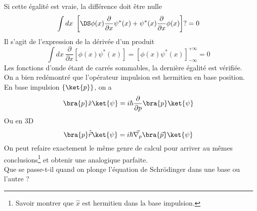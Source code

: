 Si cette égalité est vraie, la différence doit être nulle
\begin{equation}
\int dx\ \left[\DS \phi(x)\frac{\partial}{\partial x}\psi^*(x) + \psi^*(x)\frac{\partial}{\partial x}\phi(x)
\right]?=0
\end{equation}
Il s'agit de l'expression de la dérivée d'un produit
\begin{equation}
\int dx\ \dfrac{\partial}{\partial x}\left[\phi(x)\psi^*(x)\right] = \left[\phi(x)\psi^*(x)\right]_{-\infty}^{
+\infty} = 0
\end{equation}
Les fonctions d'onde étant de carrés sommables, la dernière égalité est vérifiée.
On a bien redémontré que l'opérateur impulsion est hermitien en base position. \\

En base impulsion $\left\{\ket{p}\right\}$, on a 
\begin{equation}
\bra{p}\hat{x}\ket{\psi} = i\hbar \frac{\partial}{\partial p}\bra{p}\ket{\psi}
\end{equation}
Ou en 3D
\begin{equation}
\bra{p}\hat{\vec{r}}\ket{\psi} = i\hbar\vec{\nabla_p}\bra{\vec{p}}\ket{\psi}
\end{equation}
On peut refaire exactement le même genre de calcul pour arriver au mêmes conclusions\footnote{Savoir 
montrer que $\hat{x}$ est hermitien dans la base impulsion.} et obtenir une analogique parfaite.\\

Que se passe-t-il quand on plonge l'équation de Schrödinger dans une base ou l'autre ?

